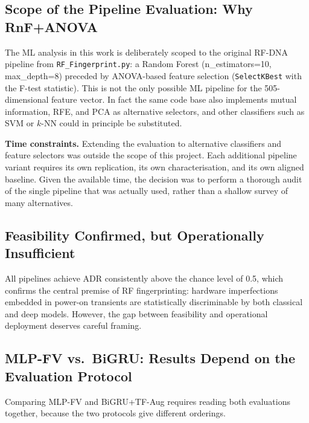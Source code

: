 \subsection{Scope of the Pipeline Evaluation: Why RnF+ANOVA}

The ML analysis in this work is deliberately scoped to the original
RF-DNA pipeline from \texttt{RF\_Fingerprint.py}: a Random Forest
(n\_estimators=10, max\_depth=8) preceded by ANOVA-based feature selection (\texttt{SelectKBest} with
the F-test statistic).
This is not the only possible ML pipeline for the 505-dimensional feature
vector. In fact the same code base also implements mutual information, RFE, and PCA as alternative selectors, and other classifiers such as SVM or
$k$-NN could in principle be substituted.


\textbf{Time constraints.}
Extending the evaluation to alternative classifiers and feature selectors
was outside the scope of this project.
Each additional pipeline variant requires its own replication, its own
characterisation, and its own aligned baseline.
Given the available time, the decision was to perform a thorough audit of
the single pipeline that was actually used, rather than a shallow
survey of many alternatives.

\subsection{Feasibility Confirmed, but Operationally Insufficient}

All pipelines achieve ADR consistently above the chance level of 0.5,
which confirms the central premise of RF fingerprinting: hardware
imperfections embedded in power-on transients are statistically
discriminable by both classical and deep models.
However, the gap between feasibility and operational deployment deserves
careful framing.

\subsection{MLP-FV vs.\ BiGRU: Results Depend on the Evaluation Protocol}

Comparing MLP-FV and BiGRU+TF-Aug requires reading both evaluations
together, because the two protocols give different orderings.

